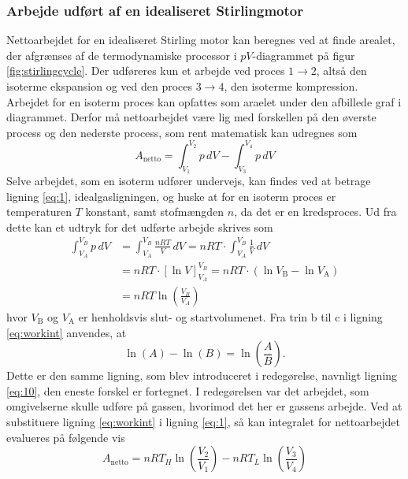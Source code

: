 \documentclass[SRC.tex]{subfiles}
\begin{document}
	\subsubsection{Arbejde udført af en idealiseret Stirlingmotor}
	Nettoarbejdet for en idealiseret Stirling motor kan beregnes ved at finde arealet, der afgrænses
	af de termodynamiske processor  i \(pV\)-diagrammet på figur \ref{fig:stirlingcycle}. Der udføreres kun et arbejde ved 
	proces \(1\rightarrow2\), altså den isoterme ekspansion og ved den proces \(3 \rightarrow 4\), 
	den isoterme kompression. Arbejdet for en isoterm proces kan opfattes som araelet under den 
	afbillede graf i diagrammet. Derfor må nettoarbejdet være lig med forskellen på den øverste
	process og den nederste process, som rent matematisk kan udregnes som
	\begin{equation}
		A_{\text{netto}} = \int_{V_1}^{V_2} p \, dV - \int_{V_3}^{V_4} p \, dV 
		\label{eq:1}
	\end{equation}
	Selve arbejdet, som en isoterm udfører undervejs, kan findes ved at betrage ligning \eqref{eq:1},
	idealgasligningen, og huske at for en isoterm proces er temperaturen \(T\) konstant, samt stofmængden \(n\), da det er en kredsproces. Ud fra dette kan et udtryk for det udførte arbejde skrives som
	\begin{subequations}
		\begin{align}
		\int_{V_A}^{V_B} p \, dV &= \int_{V_A}^{V_B} \frac{nRT}{V} \, dV  = nRT \cdot 	\int_{V_A}^{V_B} \frac{1}{V}\, dV \\
		&= nRT \cdot \left[\ln V\right]_{V_A}^{V_B}  = nRT \cdot (\ln V_\text{B} - \ln V_\text{A})\\
		&=nRT \ln\left(\frac{V_B}{V_A}\right)
		\label{eq:workint}
		\end{align}
	\end{subequations}
	hvor \(V_{\text{B}}\) og \(V_{\text{A}}\) er henholdsvis slut- og startvolumenet. Fra trin b til c
	i ligning \eqref{eq:workint} anvendes, at \[\ln(A)-\ln(B) = \ln\left(\frac{A}{B}\right). \]
	Dette er den samme ligning, som blev introduceret i redegørelse, navnligt ligning \eqref{eq:10},
	den eneste forskel er fortegnet. I redegørelsen var det arbejdet, som omgivelserne skulle udføre
	på gassen, hvorimod det her er gassens arbejde. 
	Ved at substituere ligning \eqref{eq:workint} i ligning \eqref{eq:1}, så kan integralet for 
	nettoarbejdet evalueres på følgende vis
	\begin{equation}
		A_{\text{netto}} = nRT_H\ln\left(\frac{V_2}{V_1}\right)-nRT_L\ln\left(\frac{V_3}{V_4}\right)
	\end{equation}
\end{document}
